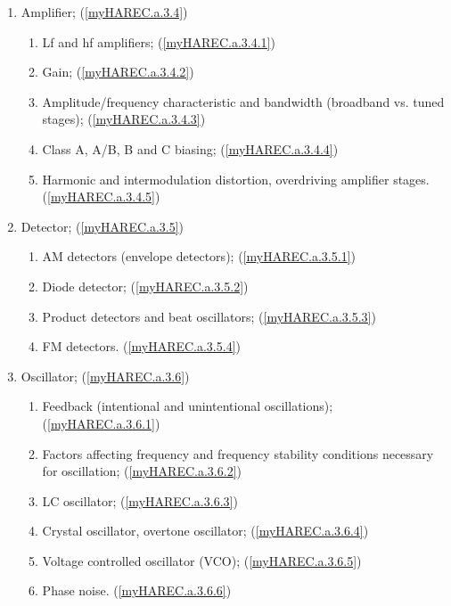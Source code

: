 \begin{enumerate}
\begin{enumerate}
\item Amplifier; (\ref{myHAREC.a.3.4})\label{HAREC.a.3.4}
\begin{enumerate}
\item Lf and hf amplifiers; (\ref{myHAREC.a.3.4.1})\label{HAREC.a.3.4.1}
\item Gain; (\ref{myHAREC.a.3.4.2})\label{HAREC.a.3.4.2}
\item Amplitude/frequency characteristic and bandwidth (broadband vs.
  tuned stages); (\ref{myHAREC.a.3.4.3})\label{HAREC.a.3.4.3}
\item Class A, A/B, B and C biasing;
  (\ref{myHAREC.a.3.4.4})\label{HAREC.a.3.4.4}
\item Harmonic and intermodulation distortion, overdriving amplifier stages.
  (\ref{myHAREC.a.3.4.5})\label{HAREC.a.3.4.5}
\end{enumerate}

\item Detector; (\ref{myHAREC.a.3.5})\label{HAREC.a.3.5}
\begin{enumerate}
\item AM detectors (envelope detectors);
  (\ref{myHAREC.a.3.5.1})\label{HAREC.a.3.5.1}
\item Diode detector; (\ref{myHAREC.a.3.5.2})\label{HAREC.a.3.5.2}
\item Product detectors and beat oscillators;
  (\ref{myHAREC.a.3.5.3})\label{HAREC.a.3.5.3}
\item FM detectors. (\ref{myHAREC.a.3.5.4})\label{HAREC.a.3.5.4}
\end{enumerate}

\item Oscillator; (\ref{myHAREC.a.3.6})\label{HAREC.a.3.6}
\begin{enumerate}
\item Feedback (intentional and unintentional oscillations);
  (\ref{myHAREC.a.3.6.1})\label{HAREC.a.3.6.1}
\item Factors affecting frequency and frequency stability conditions necessary
  for oscillation; (\ref{myHAREC.a.3.6.2})\label{HAREC.a.3.6.2}
\item LC oscillator; (\ref{myHAREC.a.3.6.3})\label{HAREC.a.3.6.3}
\item Crystal oscillator, overtone oscillator;
  (\ref{myHAREC.a.3.6.4})\label{HAREC.a.3.6.4}
\item Voltage controlled oscillator (VCO);
  (\ref{myHAREC.a.3.6.5})\label{HAREC.a.3.6.5}
\item Phase noise. (\ref{myHAREC.a.3.6.6})\label{HAREC.a.3.6.6}
\end{enumerate}


\end{enumerate}
\end{enumerate}

